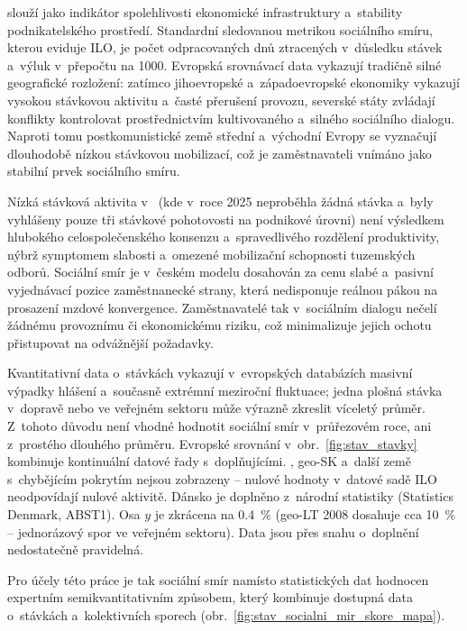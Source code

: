 slouží jako indikátor spolehlivosti ekonomické infrastruktury a~stability podnikatelského prostředí. Standardní sledovanou metrikou sociálního smíru, kterou eviduje \acs{ILO}, je počet odpracovaných dnů ztracených v~důsledku stávek a~výluk v~přepočtu na \SI{1000}{\person}. Evropská srovnávací data vykazují tradičně silné geografické rozložení: zatímco jihoevropské a~západoevropské ekonomiky vykazují vysokou stávkovou aktivitu a~časté přerušení provozu, severské státy zvládají konflikty kontrolovat prostřednictvím kultivovaného a~silného sociálního dialogu. Naproti tomu postkomunistické země střední a~východní Evropy se vyznačují dlouhodobě nízkou stávkovou mobilizací, což je zaměstnavateli vnímáno jako stabilní prvek sociálního smíru.\par

Nízká stávková aktivita v~ (kde v~roce 2025 neproběhla žádná stávka a~byly vyhlášeny pouze tři stávkové pohotovosti na podnikové úrovni) není výsledkem hlubokého celospolečenského konsenzu a~spravedlivého rozdělení produktivity, nýbrž symptomem slabosti a~omezené mobilizační schopnosti tuzemských odborů. Sociální smír je v~českém modelu dosahován za cenu slabé a~pasivní vyjednávací pozice zaměstnanecké strany, která nedisponuje reálnou pákou na prosazení mzdové konvergence. Zaměstnavatelé tak v~sociálním dialogu nečelí žádnému provoznímu či ekonomickému riziku, což minimalizuje jejich ochotu přistupovat na odvážnější požadavky.\par



Kvantitativní data o~stávkách vykazují v~evropských databázích masivní výpadky hlášení a~současně extrémní meziroční fluktuace; jedna plošná stávka v~dopravě nebo ve veřejném sektoru může výrazně zkreslit víceletý průměr. Z~tohoto důvodu není vhodné hodnotit sociální smír v~průřezovém roce, ani z~prostého dlouhého průměru. Evropské srovnání v~obr.~\ref{fig:stav_stavky} kombinuje kontinuální datové řady s~doplňujícími. , \acs{geo-SK} a~další země s~chybějícím pokrytím nejsou zobrazeny -- nulové hodnoty v~datové sadě \ac{ILO} neodpovídají nulové aktivitě. Dánsko je doplněno z~národní statistiky (Statistics Denmark, ABST1). Osa $y$ je zkrácena na \SI{0.4}{\percent} (\acs{geo-LT} 2008 dosahuje cca \SI{10}{\percent} -- jednorázový spor ve veřejném sektoru). Data jsou přes snahu o~doplnění nedostatečně pravidelná.\par

Pro účely této práce je tak sociální smír namísto statistických dat hodnocen expertním semikvantitativním způsobem, který kombinuje dostupná data o~stávkách a~kolektivních sporech (obr.~\ref{fig:stav_socialni_mir_skore_mapa}).\par

